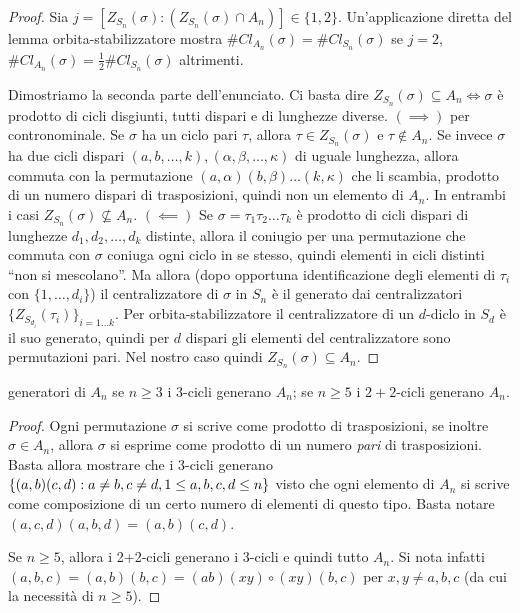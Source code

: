 \begin{proof}
    Sia $j=[Z_{S_n}(\sigma): (Z_{S_n}(\sigma) \cap A_n)] \in \{1, 2\}$. Un'applicazione diretta del lemma orbita-stabilizzatore mostra $\#Cl_{A_n}(\sigma) = \#Cl_{S_n}(\sigma)$ se $j = 2$, $\#Cl_{A_n}(\sigma) = \frac12\#Cl_{S_n}(\sigma)$ altrimenti. 
    
    Dimostriamo la seconda parte dell'enunciato. Ci basta dire $Z_{S_n}(\sigma) \subseteq A_n \iff \sigma$ è prodotto di cicli disgiunti, tutti dispari e di lunghezze diverse. $(\implies)$ per contronominale. Se $\sigma$ ha un ciclo pari $\tau$, allora $\tau \in Z_{S_n}(\sigma)$ e $\tau \notin A_n$. Se invece $\sigma$ ha due cicli dispari $(a, b, \dots, k), (\alpha, \beta, \dots, \kappa)$ di uguale lunghezza, allora commuta con la permutazione $(a, \alpha)(b, \beta) \dots (k, \kappa)$ che li scambia, prodotto di un numero dispari di trasposizioni, quindi non un elemento di $A_n$. In entrambi i casi $Z_{S_n}(\sigma) \not\subseteq A_n$.
    $(\impliedby)$ Se $\sigma = \tau_1 \tau_2 \dots \tau_k$ è prodotto di cicli dispari di lunghezze $d_1, d_2, \dots, d_k$ distinte, allora il coniugio per una permutazione che commuta con $\sigma$ coniuga ogni ciclo in se stesso, quindi elementi in cicli distinti ``non si mescolano''. Ma allora (dopo opportuna identificazione degli elementi di $\tau_i$ con $\{1, \dots, d_i\}$) il centralizzatore di $\sigma$ in $S_n$ è il generato dai centralizzatori $\{ Z_{S_{d_i}}(\tau_i) \}_{i=1\dots k}$. Per orbita-stabilizzatore il centralizzatore di un $d$-diclo in $S_d$ è il suo generato, quindi per $d$ dispari gli elementi del centralizzatore sono permutazioni pari. Nel nostro caso quindi $Z_{S_n}(\sigma) \subseteq A_n$.
\end{proof}
\begin{proposition}{generatori di $A_n$}
    se $n\geq 3$ i $3$-cicli generano $A_n$; se $n\geq 5$ i $2+2$-cicli generano $A_n$.
\end{proposition}
\begin{proof}
    Ogni permutazione $\sigma$ si scrive come prodotto di trasposizioni, se inoltre $\sigma \in A_n$, allora $\sigma$ si esprime come prodotto di un numero \emph{pari} di trasposizioni. Basta allora mostrare che i 3-cicli generano $\left\{ (a,b)(c,d) : a \neq b, c\neq d, 1\leq a,b,c,d \leq n \right\}$ visto che ogni elemento di $A_n$ si scrive come composizione di un certo numero di elementi di questo tipo. Basta notare $(a, c, d)(a, b, d) = (a,b)(c,d)$.
    
    Se $n \ge 5$, allora i 2+2-cicli generano i 3-cicli e quindi tutto $A_n$. Si nota infatti $(a, b, c) = (a, b)(b, c) = (a b)(x y) \circ (x y)(b, c)$ per $x, y \neq a, b, c$ (da cui la necessità di $n \ge 5$).
\end{proof}
